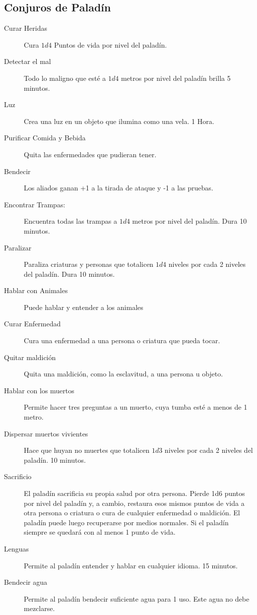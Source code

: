 \begin{multicols}{2}
\section{Conjuros de Paladín}

\begin{description}
\item[Curar Heridas] Cura $1d4$ Puntos de vida por nivel del paladín.
\item[Detectar el mal] Todo lo maligno que esté a $1d4$ metros por nivel del paladín brilla 5 minutos.
\item[Luz] Crea una luz en un objeto que ilumina como una vela. 1 Hora.
\item[Purificar Comida y Bebida] Quita las enfermedades que pudieran tener.
\item[Bendecir] Los aliados ganan +1 a la tirada de ataque y -1 a las pruebas.
\item[Encontrar Trampas:] Encuentra todas las trampas a $ 1d4$ metros por nivel del paladín. Dura 10 minutos.
\item[Paralizar] Paraliza criaturas y personas que totalicen $ 1d4$ niveles por cada 2 niveles del paladín.  Dura 10 minutos.
\item[Hablar con Animales] Puede hablar y entender a los animales
\item[Curar Enfermedad] Cura una enfermedad a una persona o criatura que pueda tocar.
\item[Quitar maldición] Quita una maldición, como la esclavitud, a una persona u objeto.
\item[Hablar con los muertos] Permite hacer tres preguntas a un muerto, cuya tumba esté a menos de 1 metro.
\item[Dispersar muertos vivientes] Hace que huyan no muertes que totalicen $ 1d3$ niveles por cada 2 niveles del paladín. 10 minutos.
\item[Sacrificio] El paladín sacrificia su propia salud por otra persona. Pierde 1d6 puntos por nivel del paladín y, a cambio, restaura esos mismos puntos de vida a otra persona o criatura o cura de cualquier enfermedad o maldición. El paladín puede luego recuperarse por medios normales. Si el paladín siempre se quedará con  al menos 1 punto de vida.
\item[Lenguas] Permite al paladín entender y hablar en cualquier idioma. 15 minutos.
\item[Bendecir agua] Permite al paladín bendecir suficiente agua para 1 uso. Este agua no debe mezclarse.
\end{description}


\end{multicols}
